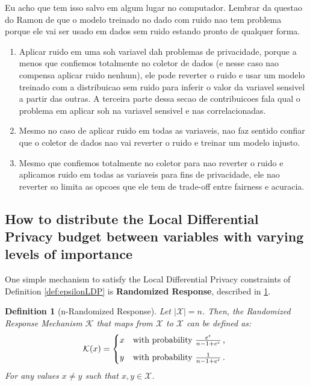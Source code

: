 \documentclass[conference]{IEEEtran}
\newtheorem{definition}{Definition}
\begin{document}
{\color{red} Eu acho que tem isso salvo em algum lugar no computador. Lembrar da questao do Ramon de que o modelo treinado no dado com ruido nao tem problema porque ele vai ser usado em dados sem ruido estando pronto de qualquer forma.}

{\color{red} \begin{enumerate}
	\item Aplicar ruido em uma soh variavel dah problemas de privacidade, porque a menos que confiemos totalmente no coletor de dados (e nesse caso nao compensa aplicar ruido nenhum), ele pode reverter o ruido e usar um modelo treinado com a distribuicao sem ruido para inferir o valor da variavel sensivel a partir das outras. A terceira parte dessa secao de contribuicoes fala qual o problema em aplicar soh na variavel sensivel e nas correlacionadas.
	\item Mesmo no caso de aplicar ruido em todas as variaveis, nao faz sentido confiar que o coletor de dados nao vai reverter o ruido e treinar um modelo injusto.
	\item Mesmo que confiemos totalmente no coletor para nao reverter o ruido e aplicamos ruido em todas as variaveis para fins de privacidade, ele nao reverter so limita as opcoes que ele tem de trade-off entre fairness e acuracia.
\end{enumerate}}

\subsection{How to distribute the Local Differential Privacy budget between variables with varying levels of importance}\label{subsec:ldpbudget}

One simple mechanism to satisfy the Local Differential Privacy constraints of Definition \ref{def:epsilonLDP} is \textbf{Randomized Response}, described in \ref{def:nrr}.

\begin{definition}[n-Randomized Response]\label{def:nrr} Let $|\mathcal{X}| = n$. Then, the Randomized Response Mechanism $\mathcal{K}$ that maps from $\mathcal{X}$ to $\mathcal{X}$ can be defined as:
	\[
	\mathcal{K}(x) = 
	\begin{dcases*}
		x
		& with probability $\frac{e^\epsilon}{n-1+e^\epsilon}$\,, \\[1ex]
		y 
	   	& with probability $\frac{1}{n-1+e^\epsilon}$\,.
	\end{dcases*}
	\]
For any values $x\neq y$ such that $x,y\in\mathcal{X}$.
\end{definition}
\end{document}
